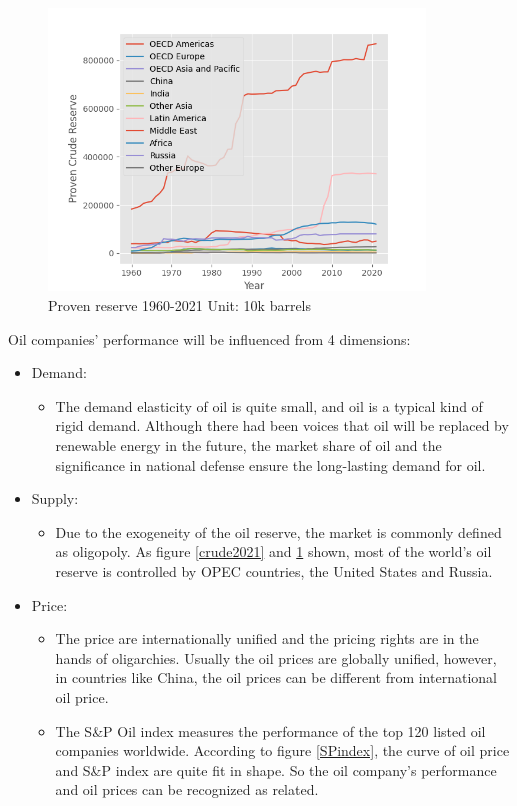 \documentclass[
	a4paper, %
	12pt,%
]{CSSullivanBusinessReport}
\begin{document}
\begin{fullwidth}
    \begin{figure}[H]
        \centering
        \includegraphics[width = 10cm]{Images/crude_reserve.png}
        \caption{Proven reserve 1960-2021 Unit: 10k barrels}
        \label{panelreserve}
    \end{figure}
    \par
    Oil companies' performance will be influenced from 4 dimensions:
    \begin{itemize}
        \item Demand:
\begin{itemize}
    \item The demand elasticity of oil is quite small, and oil is a typical kind of rigid demand. Although there had been voices that oil will be replaced by renewable energy in the future, the market share of oil and the significance in national defense ensure the long-lasting demand for oil.
\end{itemize}
        \item Supply:
\begin{itemize}
    \item Due to the exogeneity of the oil reserve, the market is commonly defined as oligopoly. As  figure \ref{crude2021} and \ref{panelreserve} shown, most of the world's oil reserve is controlled by OPEC countries, the United States and Russia.
    \end{itemize}
    \item Price:
        \begin{itemize}
        \item The price are internationally unified and the pricing rights are in the hands of oligarchies. Usually the oil prices are globally unified, however, in countries like China, the oil prices can be different from international oil price.
        \item The S\&P Oil index measures the performance of the top 120 listed oil companies worldwide. According to figure \ref{SPindex}, the curve of oil price and S\&P index are quite fit in shape. So the oil company's performance and oil prices can be recognized as related.

\end{itemize}
\end{itemize}
\end{fullwidth}
\end{document}
